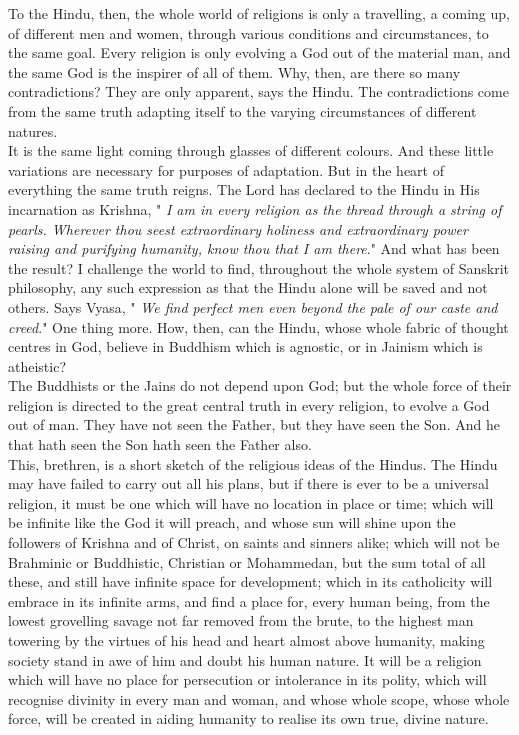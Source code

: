 To the Hindu, then, the whole world of religions is only a
travelling, a coming up,
of different men and women, through various conditions and
circumstances, to the same
goal. Every religion is only evolving a God out of the material man,
and the same God
is the inspirer of all of them. Why, then, are there so many
contradictions? They are
only apparent, says the Hindu. The contradictions come from the same
truth adapting
itself to the varying circumstances of different natures.\\

It is the same light coming through glasses of different
colours. And these little
variations are necessary for purposes of adaptation. But in the heart
of everything the
same truth reigns. The Lord has declared to the Hindu in His
incarnation as
Krishna, " \textit{I am in every religion as the thread through a
string of pearls.
Wherever thou seest extraordinary holiness and extraordinary power
raising and
purifying humanity, know thou that I am there}." And what has
been the result?
I challenge the world to find, throughout the whole system of Sanskrit
philosophy,
any such expression as that the Hindu alone will be saved and not
others. Says
Vyasa, " \textit{We find perfect men even beyond the pale of our caste
and
creed}." One thing more. How, then, can the Hindu, whose whole
fabric of
thought centres in God, believe in Buddhism which is agnostic, or in
Jainism which
is atheistic?\\

The Buddhists or the Jains do not depend upon God; but the
whole force of their
religion is directed to the great central truth in every religion, to
evolve a God out
of man. They have not seen the Father, but they have seen the Son. And
he that hath
seen the Son hath seen the Father also. \\

This, brethren, is a short sketch of the religious ideas of
the Hindus. The Hindu
may have failed to carry out all his plans, but if there is ever to be
a universal
religion, it must be one which will have no location in place or time;
which will
be infinite like the God it will preach, and whose sun will shine upon
the followers
of Krishna and of Christ, on saints and sinners alike; which will not
be Brahminic or
Buddhistic, Christian or Mohammedan, but the sum total of all these,
and still have
infinite space for development; which in its catholicity will embrace
in its infinite
arms, and find a place for, every human being, from the lowest
grovelling savage not
far removed from the brute, to the highest man towering by the virtues
of his head and
heart almost above humanity, making society stand in awe of him and
doubt his human
nature. It will be a religion which will have no place for persecution
or intolerance
in its polity, which will recognise divinity in every man and woman,
and whose whole
scope, whose whole force, will be created in aiding humanity to realise
its own true,
divine nature.\\

